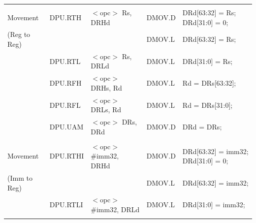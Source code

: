 \begin{table}
\begin{subtable}{\linewidth}
\begin{center}
\begin{tabular}{lllll}
                   &                   &                                       &                   &                                                                               \\
Movement           & DPU.RTH           & $<$opc$>$ Rs, DRHd                    & DMOV.D            & DRd[63:32] = Rs; DRd[31:0] = 0;                                               \\
(Reg to Reg)       &                   &                                       & DMOV.L            & DRd[63:32] = Rs;                                                              \\
                   & DPU.RTL           & $<$opc$>$ Rs, DRLd                    & DMOV.L            & DRd[31:0] = Rs;                                                               \\
                   & DPU.RFH           & $<$opc$>$ DRHs, Rd                    & DMOV.L            & Rd = DRs[63:32];                                                              \\
                   & DPU.RFL           & $<$opc$>$ DRLs, Rd                    & DMOV.L            & Rd = DRs[31:0];                                                               \\
                   & DPU.UAM           & $<$opc$>$ DRs, DRd                    & DMOV.D            & DRd = DRs;                                                                    \\
                   &                   &                                       &                   &                                                                               \\
Movement           & DPU.RTHI          & $<$opc$>$ \#imm32, DRHd               & DMOV.D            & DRd[63:32] = imm32; DRd[31:0] = 0;                                            \\
(Imm to Reg)       &                   &                                       & DMOV.L            & DRd[63:32] = imm32;                                                           \\
                   & DPU.RTLI          & $<$opc$>$ \#imm32, DRLd               & DMOV.L            & DRd[31:0] = imm32;                                                            \\
                   &                   &                                       &                   &                                                                               \\

\end{tabular}
\end{center}
\end{subtable}
\end{table}
